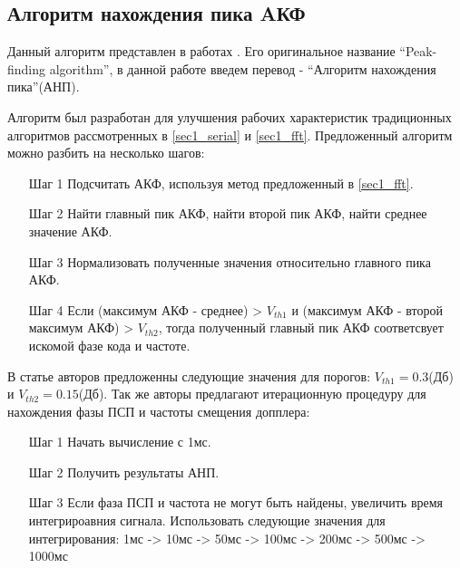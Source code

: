 \subsection{Алгоритм нахождения пика AКФ}

Данный алгоритм представлен в работах \cite{2max_ieee, 2max_article}. Его оригинальное название
\textquotedblleft{Peak-finding algorithm}\textquotedblright,
в данной работе введем перевод -
\textquotedblleft{Алгоритм нахождения пика}\textquotedblright (АНП). 

Алгоритм был разработан для улучшения рабочих характеристик традиционных алгоритмов рассмотренных в
\ref{sec1_serial} и \ref{sec1_fft}. Предложенный алгоритм можно разбить на несколько шагов:
\begin{itemize}
\item[Шаг 1] Подсчитать АКФ, используя метод предложенный в \ref{sec1_fft}.
\item[Шаг 2] Найти главный пик АКФ, найти второй пик АКФ, найти среднее значение АКФ.
\item[Шаг 3] Нормализовать полученные значения относительно главного пика АКФ.
\item[Шаг 4] Если (максимум АКФ - среднее) > ${V_{th1}}$ и (максимум АКФ - 
	второй максимум АКФ) > ${V_{th2}}$, тогда полученный главный пик АКФ соответсвует
	искомой фазе кода и частоте.
\end{itemize}

В статье авторов \cite{2max_ieee} предложенны следующие значения для порогов:
${V_{th1}} = 0.3$(Дб) и  ${V_{th2}} = 0.15$(Дб). Так же авторы предлагают итерационную процедуру для нахождения
фазы ПСП и частоты смещения допплера:
\begin{itemize}
\item[Шаг 1] Начать вычисление с 1мс.
\item[Шаг 2] Получить результаты АНП.
\item[Шаг 3] Если фаза ПСП и частота не могут быть найдены, увеличить время интегрироавния сигнала.
	Использовать следующие значения для интегрирования: 1мс -> 10мс -> 50мс -> 100мс -> 200мс ->
	500мс -> 1000мс
\end{itemize}


\newpage
